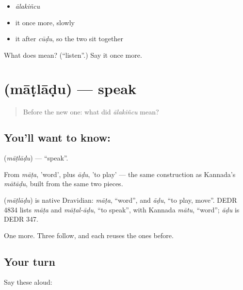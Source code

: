 \begin{itemize}
\raggedright
  \item \emph{ālakiñcu}
  \item it once more, slowly
  \item it after \emph{cūḍu}, so the two sit together
\end{itemize}

\begin{tcolorbox}[breakable,colback=teal!4,colframe=teal!35!black,title={Before you move on}]
What does  mean? (\textquotedblleft{}listen\textquotedblright{}.) Say it once more.
\end{tcolorbox}
\section[\texorpdfstring{\te{మాట్లాడు} (māṭlāḍu)}{మాట్లాడు (māṭlāḍu)}]{ (māṭlāḍu) — speak}

\label{lesson:TE-C44-speak}



\begin{quote}
Before the new one: what did \emph{ālakiñcu} mean?
\end{quote}

\subsection*{You'll want to know: }
\textbf{} (\emph{māṭlāḍu}) — \textquotedblleft{}speak\textquotedblright{}.

From \emph{māṭa}, 'word', plus \emph{āḍu}, 'to play' — the same construction as Kannada's \emph{mātāḍu}, built from the same two pieces.

\begin{cousinweb}
\textbf{} (\emph{māṭlāḍu}) is native Dravidian: \emph{māṭa}, \textquotedblleft{}word\textquotedblright{}, and \emph{āḍu}, \textquotedblleft{}to play, move\textquotedblright{}. DEDR 4834 lists \emph{māṭa} and \emph{māṭal-āḍu}, \textquotedblleft{}to speak\textquotedblright{}, with Kannada \emph{mātu}, \textquotedblleft{}word\textquotedblright{}; \emph{āḍu} is DEDR 347.
\end{cousinweb}

\begin{grammarlens}[title={What you've built}]
One more. Three follow, and each reuses the ones before.
\end{grammarlens}

\subsection*{Your turn}
Say these aloud:

